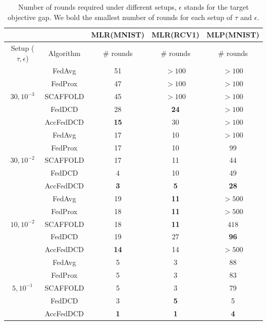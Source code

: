 \begin{table}[t]
    \centering
    \begin{tabular}{ccccc}
    \toprule
    & & MLR(MNIST)& MLR(RCV1) & MLP(MNIST) \\ \hline
    Setup ($\tau, \epsilon$) & Algorithm & \# rounds  & \# rounds  & \# rounds \\  \cline{1-5}
    \multirow{5}{*}{$30, 10^{-3}$} & FedAvg & 51 &  $>100$  & $>100$  \\ 
    & FedProx & 47  & $>100$  & $>100$ \\
    & SCAFFOLD & 45  & $>100$  & $>100$ \\
    & FedDCD & 28  & \textbf{24}  & $>100$ \\
    & AccFedDCD & \textbf{15} & 30  & $>100$ \\ \cline{2-5}
    \multirow{5}{*}{$30, 10^{-2}$} & FedAvg & 17 &  10  & $>100$  \\ 
    & FedProx & 17  & 10  & 99 \\
    & SCAFFOLD & 17  & 11  & 44 \\
    & FedDCD & 4  & 10  & 49 \\
    & AccFedDCD & \textbf{3} & \textbf{5}  & \textbf{28} \\ \cline{2-5}
    \multirow{5}{*}{$10, 10^{-2}$} & FedAvg & 19 &  \textbf{11}  & $>500$  \\ 
    & FedProx & 18  & \textbf{11}  & $>500$ \\
    & SCAFFOLD & 18  & \textbf{11}  & $418$ \\
    & FedDCD & 19  & 27  & \textbf{96} \\
    & AccFedDCD & \textbf{14} & 14  & $>500$ \\ \cline{2-5}
    \multirow{5}{*}{$5, 10^{-1}$} & FedAvg & 5 &  3  & 88  \\ 
    & FedProx & 5  & 3  & 83 \\
    & SCAFFOLD & 5  & 3  & 79 \\
    & FedDCD & 3  & \textbf{5}  & 5 \\
    & AccFedDCD & \textbf{1} & \textbf{1}  & \textbf{4} 
    \\ \bottomrule
    \end{tabular}
    \caption{Number of rounds required under different setups, $\epsilon$ stands for the target objective gap. We bold the smallest number of rounds for each setup of $\tau$ and $\epsilon$.}  \label{tab:impactOfParticipationRate}
 \end{table}

